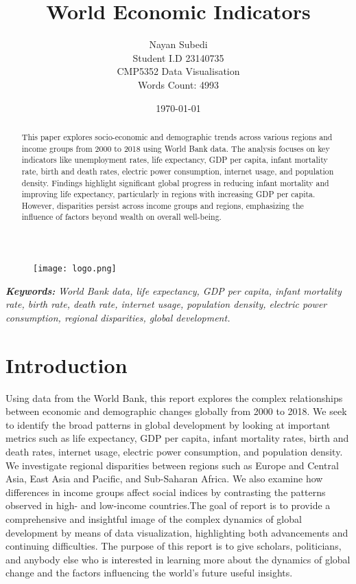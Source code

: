 \documentclass{article}\usepackage[]{graphicx}\usepackage[]{xcolor}
\begin{document}
\begin{figure}[t]
    \centering
    \texttt{[image: logo.png]}
\end{figure}

\title{World Economic Indicators}
\author{Nayan Subedi\\ Student I.D 23140735 \\ CMP5352 Data Visualisation\\ Words Count: 4993}
\date{\today}
\maketitle

\newpage

\begin{abstract}
This paper explores socio-economic and demographic trends across various regions and income groups from 2000 to 2018 using World Bank data. The analysis focuses on key indicators like unemployment rates, life expectancy, GDP per capita, infant mortality rate, birth and death rates, electric power consumption, internet usage, and population density. Findings highlight significant global progress in reducing infant mortality and improving life expectancy, particularly in regions with increasing GDP per capita. However, disparities persist across income groups and regions, emphasizing the influence of factors beyond wealth on overall well-being.
\end{abstract}

\textbf\textit{Keywords:}\textit{ World Bank data, life expectancy, GDP per capita, infant mortality rate, birth rate, death rate, internet usage, population density, electric power consumption, regional disparities, global development.}

\newpage
\tableofcontents

\newpage
\listoffigures
\newpage

\section{Introduction}
Using data from the World Bank, this report explores the complex relationships between economic and demographic changes globally from 2000 to 2018. We seek to identify the broad patterns in global development by looking at important metrics such as life expectancy, GDP per capita, infant mortality rates, birth and death rates, internet usage, electric power consumption, and population density. We investigate regional disparities between regions such as Europe and Central Asia, East Asia and Pacific, and Sub-Saharan Africa. We also examine how differences in income groups affect social indices by contrasting the patterns observed in high- and low-income countries.The goal of report is to provide a comprehensive and insightful image of the complex dynamics of global development by means of data visualization, highlighting both advancements and continuing difficulties. The purpose of this report is to give scholars, politicians, and anybody else who is interested in learning more about the dynamics of global change and the factors influencing the world's future useful insights.
\end{document}
